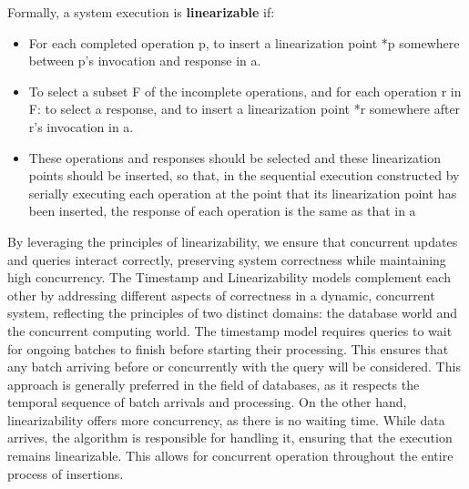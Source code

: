 Formally, a system execution is \textbf{linearizable} if:  
\begin{itemize}  [noitemsep, topsep=3pt, partopsep=0pt, parsep=0pt]
    \item For each completed operation p, to insert a
    linearization point *p somewhere between p's
    invocation and response in a.
    \item To select a subset F of the incomplete operations,
    and for each operation r in F:
    to select a response, and
    to insert a linearization point *r somewhere after r's invocation in a.
    \item These operations and responses should be selected and these 
    linearization points should be inserted, so
    that, in the sequential execution constructed by
    serially executing each operation at the point that
    its linearization point has been inserted, the
    response of each operation is the same as that in a
\end{itemize} 
% 
By leveraging the principles of linearizability, we ensure that concurrent updates and queries
interact correctly, preserving system correctness while maintaining high concurrency. 
% 
The Timestamp and Linearizability models complement each other by addressing different
aspects of correctness in a dynamic, concurrent system, reflecting the principles of two
distinct domains: the database world and the concurrent computing world.
The timestamp model requires queries to wait for ongoing batches to finish before starting
their processing. This ensures that any batch arriving before or concurrently with the query
will be considered. This approach is generally preferred in the field of databases, as it
respects the temporal sequence of batch arrivals and processing.
On the other hand, linearizability offers more concurrency, as there is no waiting time.
While data arrives, the algorithm is responsible for handling it, ensuring that the execution
remains linearizable. This allows for concurrent operation throughout the entire process of
insertions. 
